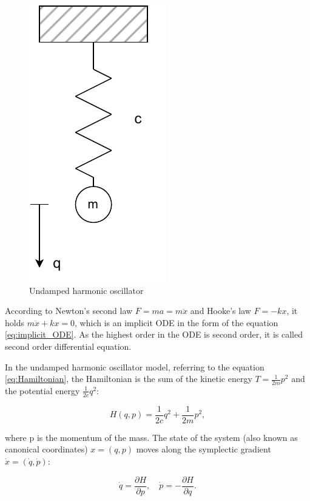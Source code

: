 \documentclass[
	parskip, 			   %
	twoside, 			   %
	DIV=14, 			   %
	BCOR=15.0mm, 		   %
	headsepline, 		   %
	open=right, 		   %
	captions=tableheading, %
	bibliography=totoc,    %
	numbers=noenddot       %
]{scrreprt}
\begin{document}
\clearpage
\begin{figure}[h!]
    \centering
    \includegraphics[scale=1]{figures/undamped harmonic oscillator.pdf}
    \caption{Undamped harmonic oscillator}
    \label{fig:physical_model_undamped_harmonic_oscillator}
\end{figure}

According to Newton's second law $F=ma=m\ddot{x}$ and Hooke's law $F=-kx$, it holds $m\ddot{x}+kx=0$, which is an implicit ODE in the form of the equation \ref{eq:implicit_ODE}. As the highest order in the ODE is second order, it is called second order differential equation.

In the undamped harmonic oscillator model, referring to the equation \ref{eq:Hamiltonian}, the Hamiltonian is the sum of the kinetic energy $T=\frac{1}{2m}p^2$ and the potential energy $\frac{1}{2c}q^2$:

\begin{equation}
    \label{eq:Hamiltonian_udho}
    H(q,p)=\frac{1}{2c}q^2+\frac{1}{2m}p^2,
\end{equation}

where p is the momentum of the mass. The state of the system (also known as canonical coordinates) $x=(q,p)$ moves along the symplectic gradient $\dot{x}=(\dot{q},\dot{p})$:

\begin{equation}
    \label{eq:symplectic_gradient}
    \dot{q}=\frac{\partial H}{\partial p}, \quad \dot{p}=-\frac{\partial H}{\partial q}.
\end{equation}
\end{document}
